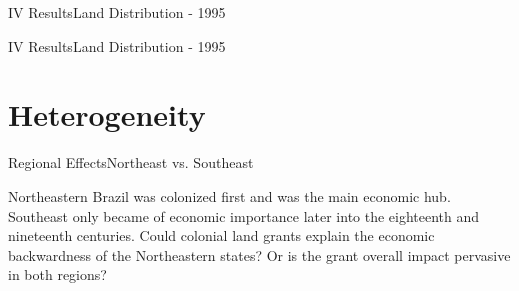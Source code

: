 \documentclass[aspectratio=1610]{beamer}
\begin{document}
\begin{frame}{IV Results}{Land Distribution - 1995}
    \begin{figure}[h!]
        \begin{center}
        \end{center}
      \end{figure}
\end{frame}

\begin{frame}{IV Results}{Land Distribution - 1995}
    \begin{figure}[h!]
        \begin{center}
        \end{center}
      \end{figure}
\end{frame}

\section{Heterogeneity}

\begin{frame}{Regional Effects}{Northeast vs. Southeast}
    \begin{outline}
        \1 Northeastern Brazil was colonized first and was the main economic hub.
        \vspace{2mm}
        \1 Southeast only became of economic importance later into the eighteenth and nineteenth centuries.
        \vspace{2mm}
        \1 Could colonial land grants explain the economic backwardness of the Northeastern states?
        \vspace{2mm}
        \2 Or is the grant overall impact pervasive in both regions?
    \end{outline}
\end{frame}
\end{document}
